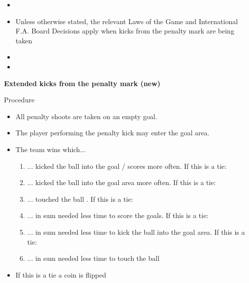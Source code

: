 \begin{itemize}
{      remain on the field of play, outside the penalty area in which the kicks.
      All players, except the player taking the kick and the two goalkeepers,
      must remain within the centre circle)}
\item {}
\item Unless otherwise stated, the relevant Laws of the Game and International F.A. Board Decisions apply when kicks from the penalty mark are being taken
\item {}
\item {}
\end{itemize}


{\bfseries Extended kicks from the penalty mark (new) }

\bigskip

Procedure

\headlinebox

\begin{itemize}
\item All penalty shoots are taken on an empty goal.
\item The player performing the penalty kick may enter the goal area.
\item The team wins which...
\begin{enumerate}
\item ... kicked the ball into the goal / scores more often. If this is a tie:
\item ... kicked the ball into the goal area more often. If this is a tie:
\item ... touched the ball  . If this is a tie:
\item ... in sum needed less time to score the goals. If this is a tie:
\item ... in sum needed less time to kick the ball into the goal area. If this is a tie:
\item ... in sum needed less time to touch the ball
\end{enumerate}
\item If this is a tie a coin is flipped
\end{itemize}
